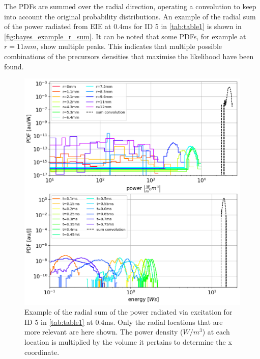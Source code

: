 The PDFs are summed over the radial direction, operating a convolution to keep into account the original probability distributions. An example of the radial sum of the power radiated from EIE at 0.4ms for ID 5 in \autoref{tab:table1} is shown in \autoref{fig:bayes_example_r_sum}. It can be noted that some PDFs, for example at $r=11mm$, show multiple peaks. This indicates that multiple possible combinations of the precursors densities that maximise the likelihood have been found.
\begin{figure}
	\centering
	\includegraphics[width=0.9\linewidth,trim={0 332 0 0},clip]{Chapters/chapter3/figs/Bayesian_example_1.png}
	\caption{Example of the radial sum of the power radiated via excitation for ID 5 in \autoref{tab:table1} at 0.4ms. Only the radial locations that are more relevant are here shown. The power density ($W/m^3$) at each location is multiplied by the volume it pertains to determine the x coordinate.}
	\label{fig:bayes_example_r_sum}
\end{figure}

